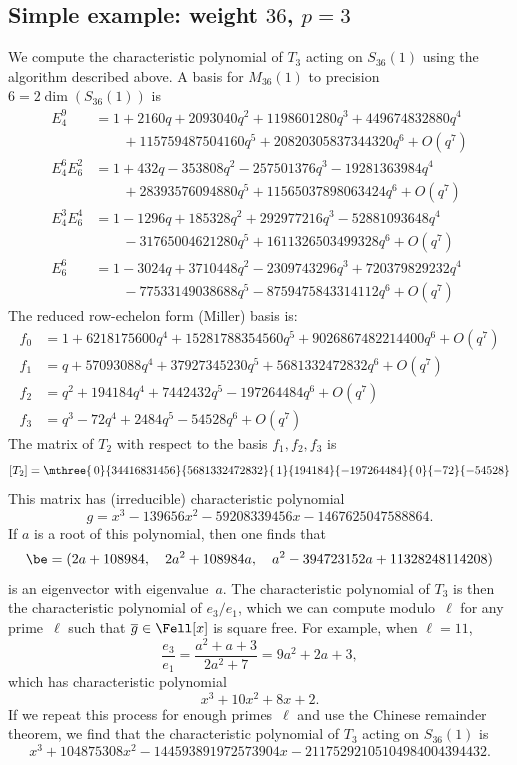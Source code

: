 \documentclass{report}
\begin{document}
\subsection{Simple example: weight $36$, $p=3$}
We compute the characteristic polynomial of $T_3$ acting on
$S_{36}(1)$ using the algorithm described above.  A basis for
$M_{36}(1)$ to precision $6=2\dim(S_{36}(1))$ is
\begin{align*}
 E_4^9 &=
1 + 2160q + 2093040q^2 + 1198601280q^3 + 449674832880q^4 \\&\qquad +115759487504160q^5 + 20820305837344320q^6 +
    O(q^7)\\
E_4^6 E_6^2 &= 1 + 432q - 353808q^2 - 257501376q^3 - 19281363984q^4 \\&\qquad +28393576094880q^5 + 11565037898063424q^6 + O(q^7)
\\
E_4^3 E_6^4 &= 1 - 1296q + 185328q^2 + 292977216q^3 - 52881093648q^4 \\&\qquad- 31765004621280q^5 + 1611326503499328q^6 + O(q^7)\\
E_6^6 &=1 - 3024q + 3710448q^2 - 2309743296q^3 + 720379829232q^4 \\&\qquad- 77533149038688q^5 - 8759475843314112q^6 +
    O(q^7)
\end{align*}
The reduced row-echelon form (Miller) basis is:
\begin{align*}
f_0 &= 1 + 6218175600q^4 + 15281788354560q^5 + 9026867482214400q^6 + O(q^7)\\
f_1 &= q + 57093088q^4 + 37927345230q^5 + 5681332472832q^6 + O(q^7)\\
f_2 &= q^2 + 194184q^4 + 7442432q^5 - 197264484q^6 + O(q^7)\\
f_3 &= q^3 - 72q^4 + 2484q^5 - 54528q^6 + O(q^7)
\end{align*}
The matrix of $T_2$ with respect to the basis $f_1,f_2,f_3$ is
\[
[T_2] =
\mthree{\,0}{\hfill   34416831456 }{\hfill 5681332472832}
{\, 1   }{  \hfill   194184 }{\hfill   -197264484}
{  \, 0  }{   \hfill      -72  }{\hfill      -54528}
\]
This matrix has (irreducible) characteristic polynomial
\[
   g = x^3 - 139656x^2 - 59208339456x - 1467625047588864.
\]
If $a$ is a root of this polynomial, then one finds that
\[
\be = (
2a + 108984,\quad
2a^2 + 108984a,\quad
a^2 - 394723152a + 11328248114208)
\]
is an eigenvector with eigenvalue~$a$. The characteristic
polynomial of $T_3$ is then the characteristic polynomial of
$e_3/e_1$, which we can compute modulo~$\ell$ for any prime~$\ell$
such that $\overline{g}\in\Fell[x]$ is square free. For example,
when $\ell=11$,
\[
  \frac{e_3}{e_1} = \frac{a^2 + a + 3}{2a^2+7} = 9a^2 + 2a + 3,
\]
which has characteristic polynomial
\[
x^3 + 10x^2 + 8x + 2.
\]
If we repeat this process for enough primes~$\ell$ and use the
Chinese remainder theorem, we find that the characteristic
polynomial of $T_3$ acting on $S_{36}(1)$ is
\[
x^3 + 104875308x^2 - 144593891972573904x -
21175292105104984004394432.
\]
\end{document}
